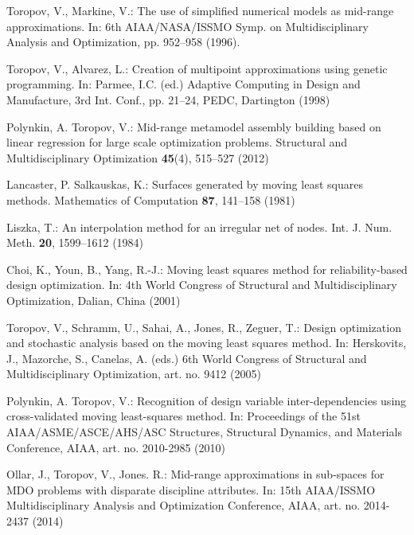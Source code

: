 \documentclass[runningheads,a4paper]{llncs}
\begin{document}
\begin{thebibliography}{10}
Toropov, V., Markine, V.:
\newblock The use of simplified numerical models as mid-range approximations.
\newblock In: 6th AIAA/NASA/ISSMO Symp. on Multidisciplinary Analysis and Optimization, pp. 952--958 (1996).

Toropov, V., Alvarez, L.:
\newblock Creation of multipoint approximations using genetic programming.
\newblock In: Parmee, I.C. (ed.) Adaptive Computing in Design and Manufacture, 3rd Int. Conf.,
   pp. 21--24, PEDC, Dartington (1998)

Polynkin, A. Toropov, V.:
\newblock Mid-range metamodel assembly building based on linear regression for large scale optimization problems.
\newblock Structural and Multidisciplinary Optimization \textbf{45}(4), 515--527 (2012)

Lancaster, P. Salkauskas, K.:
\newblock Surfaces generated by moving least squares methods.
\newblock Mathematics of Computation \textbf{87}, 141--158 (1981)

Liszka, T.:
\newblock An interpolation method for an irregular net of nodes.
\newblock Int. J. Num. Meth. \textbf{20}, 1599--1612 (1984)

Choi, K., Youn, B., Yang, R.-J.:
\newblock Moving least squares method for reliability-based design optimization.
\newblock In: 4th World Congress of Structural and Multidisciplinary Optimization, Dalian, China (2001)

Toropov, V., Schramm, U., Sahai, A., Jones, R., Zeguer, T.:
\newblock Design optimization and stochastic analysis based on the moving least squares method.
\newblock In: Herskovits, J., Mazorche, S., Canelas, A. (eds.) 6th World Congress of Structural and Multidisciplinary Optimization, art. no. 9412 (2005)

Polynkin, A. Toropov, V.:
\newblock Recognition of design variable inter-dependencies using cross-validated moving least-squares method.
\newblock In: Proceedings of the 51st AIAA/ASME/ASCE/AHS/ASC Structures, Structural Dynamics, and Materials Conference, AIAA, art. no. 2010-2985 (2010)

Ollar, J., Toropov, V., Jones. R.:
\newblock  Mid-range approximations in sub-spaces for MDO problems with disparate discipline attributes.
\newblock In: 15th AIAA/ISSMO Multidisciplinary Analysis and Optimization Conference, AIAA, art. no. 2014-2437 (2014)


\end{thebibliography}
\end{document}
